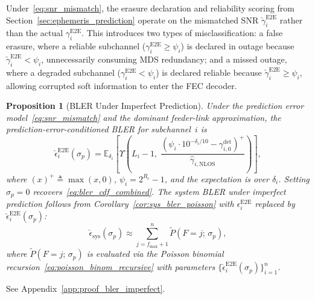 \documentclass[journal]{IEEEtran}
\newtheorem{proposition}{Proposition}
\begin{document}
Under~\eqref{eq:snr_mismatch}, the erasure declaration and
reliability scoring from Section~\ref{sec:ephemeris_prediction}
operate on the mismatched SNR $\check{\gamma}_i^{\mathrm{E2E}}$
rather than the actual $\gamma_i^{\mathrm{E2E}}$.
This introduces two types of misclassification:
a false erasure, where a reliable subchannel
($\gamma_i^{\mathrm{E2E}} \geq \psi_i$) is declared in outage
because $\check{\gamma}_i^{\mathrm{E2E}} < \psi_i$,
unnecessarily consuming MDS redundancy;
and a missed outage, where a degraded subchannel
($\gamma_i^{\mathrm{E2E}} < \psi_i$) is declared reliable
because $\check{\gamma}_i^{\mathrm{E2E}} \geq \psi_i$,
allowing corrupted soft information to enter the FEC decoder.

\begin{proposition}[BLER Under Imperfect Prediction]
\label{prop:bler_imperfect}
Under the prediction error model~\eqref{eq:snr_mismatch}
and the dominant feeder-link approximation,
the prediction-error-conditioned BLER for subchannel~$i$ is
\begin{equation}
\check{\epsilon}_i^{\mathrm{E2E}}(\sigma_p)
= \mathbb{E}_{\delta_i}\!\left[
\Upsilon\!\left(L_i - 1,\;
\frac{\left(\psi_i\cdot 10^{-\delta_i/10}
  - \gamma_{i,0}^{\mathrm{det}}\right)^{+}}
{\hat{\gamma}_{i,\mathrm{NLOS}}}\right)\right],
\label{eq:bler_imperfect}
\end{equation}
where $(x)^{+} \triangleq \max(x,0)$,
$\psi_i = 2^{R_c} - 1$, and the expectation is over
$\delta_i$.
Setting $\sigma_p = 0$
recovers~\eqref{eq:bler_cdf_combined}.
The system BLER under imperfect prediction follows from
Corollary~\ref{cor:sys_bler_poisson} with
$\epsilon_i^{\mathrm{E2E}}$ replaced by
$\check{\epsilon}_i^{\mathrm{E2E}}(\sigma_p)$:
\begin{equation}
\check{\epsilon}_{\mathrm{sys}}(\sigma_p)
\approx \sum_{j=f_{\max}+1}^{n}
\tilde{P}(F = j;\,\sigma_p),
\label{eq:sys_bler_imperfect}
\end{equation}
where $\tilde{P}(F = j;\,\sigma_p)$ is evaluated via the
Poisson binomial recursion~\eqref{eq:poisson_binom_recursive}
with parameters
$\{\check{\epsilon}_i^{\mathrm{E2E}}(\sigma_p)\}_{i=1}^{n}$.
\end{proposition}

\begin{IEEEproof}
See Appendix~\ref{app:proof_bler_imperfect}.
\end{IEEEproof}
\end{document}

